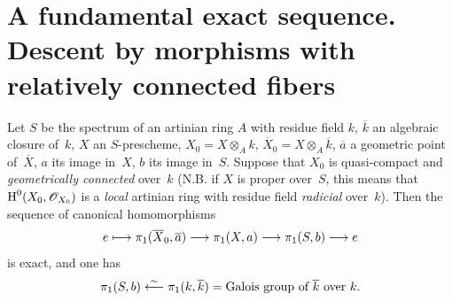 \section[A fundamental exact sequence]{A fundamental exact sequence. Descent by morphisms with
relatively connected fibers}
\label{IX.6}

\begin{theorem}
\label{IX.6.1}
Let $S$ be the spectrum of an artinian ring $A$ with residue field
$k$, $\overline{k}$ an algebraic closure of~$k$, $X$ an $S$-prescheme,
$X_0=X\otimes_A k$, $\overline{X}_0=X\otimes_A
\overline{k}$, $\overline{a}$ a geometric point
of~$\overline{X}$, $a$ its image in~$X$, $b$ its image in~$S$. Suppose
that $X_0$ is quasi-compact and \emph{geometrically
connected} over~$k$ (N.B. if $X$ is proper over~$S$, this means that
$\H^0(X_0,\cal{O}_{X_0})$ is a \emph{local} artinian ring with residue
field \emph{radicial} over~$k$). Then the sequence of canonical
homomorphisms
$$
e\mto \pi_1(\overline{X}_0,\overline{a})\to
\pi_1(X,a)\to\pi_1(S,b)\to e
$$
is exact, and one has
$$
\pi_1(S,b)\overset{\sim}{\longleftarrow} \pi_1(k,\overline{k})=\text{Galois group
of~$\overline{k}$ over~$k$.}
$$
\end{theorem}

